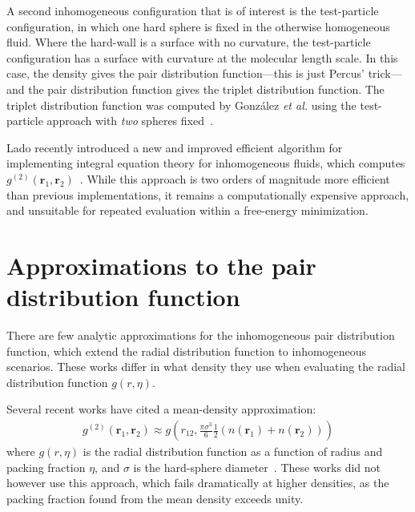 \documentclass[letterpaper,twocolumn,amsmath,amssymb,pre,aps,10pt]{revtex4-1}
\newcommand{\rr}{\textbf{r}}
\begin{document}
A second inhomogeneous configuration that is of interest is the
test-particle configuration, in which one hard sphere is fixed in the
otherwise homogeneous fluid.  Where the hard-wall is a surface with no
curvature, the test-particle configuration has a surface with
curvature at the molecular length scale.  In this case, the density
gives the pair distribution function---this is just Percus'
trick---and the pair distribution function gives the triplet
distribution function.  The triplet distribution function was computed
by Gonz\'alez \emph{et al.} using the test-particle approach with
\emph{two} spheres fixed~\cite{gonzalez1999test}.

Lado recently introduced a new and improved efficient algorithm for
implementing integral equation theory for inhomogeneous fluids, which
computes $g^{(2)}(\rr_1,\rr_2)$~\cite{lado2009efficient}.  While this
approach is two orders of magnitude more efficient than previous
implementations, it remains a computationally expensive approach, and
unsuitable for repeated evaluation within a free-energy minimization.

\section{Approximations to the pair distribution function}
There are few analytic approximations for the inhomogeneous pair
distribution function, which extend the radial distribution function
to inhomogeneous scenarios.  These works differ in what density they
use when evaluating the radial distribution function $g(r,\eta)$.

Several recent works have cited a
mean-density approximation:
\begin{align}
  g^{(2)}(\rr_1,\rr_2) \approx g\left(r_{12}, \frac{\pi\sigma^3}{6}\tfrac12
  (n(\rr_1)+n(\rr_2))\right)
\end{align}
where $g(r,\eta)$ is the radial distribution function as a function of
radius and packing fraction $\eta$, and $\sigma$ is the hard-sphere
diameter~\cite{gloor2007prediction, gross2009density}.  These works
did not however use this approach, which fails dramatically at higher
densities, as the packing fraction found from the mean density exceeds
unity.
\end{document}
